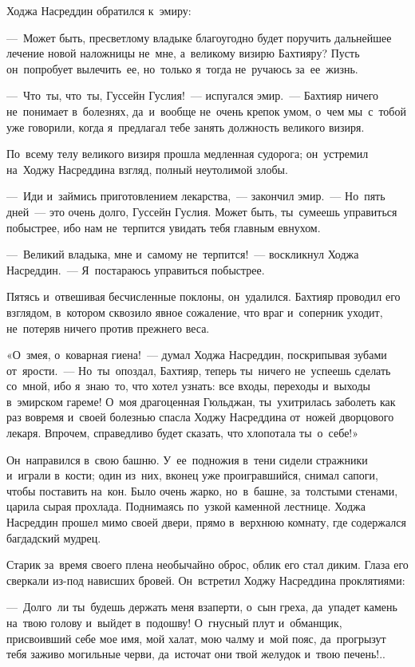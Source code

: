 \documentclass[12pt,a4paper]{book}
\begin{document}
Ходжа Насреддин обратился к~эмиру:

—~Может быть, пресветлому владыке благоугодно будет поручить дальнейшее лечение новой наложницы не~мне, а~великому визирю Бахтияру? Пусть он~попробует вылечить~ее, но~только я~тогда не~ручаюсь за~ее~жизнь.

—~Что~ты, что~ты, Гуссейн Гуслия!~— испугался эмир.~— Бахтияр ничего не~понимает в~болезнях, да~и~вообще не~очень крепок умом, о~чем мы~с~тобой уже говорили, когда я~предлагал тебе занять должность великого визиря.

По~всему телу великого визиря прошла медленная судорога; он~устремил на~Ходжу Насреддина взгляд, полный неутолимой злобы.

—~Иди и~займись приготовлением лекарства,~— закончил эмир.~— Но~пять дней~— это очень долго, Гуссейн Гуслия. Может быть, ты~сумеешь управиться побыстрее, ибо нам не~терпится увидать тебя главным евнухом.

—~Великий владыка, мне и~самому не~терпится!~— воскликнул Ходжа Насреддин.~— Я~постараюсь управиться побыстрее.

Пятясь и~отвешивая бесчисленные поклоны, он~удалился. Бахтияр проводил его взглядом, в~котором сквозило явное сожаление, что враг и~соперник уходит, не~потеряв ничего против прежнего веса.

«О~змея, о~коварная гиена!~— думал Ходжа Насреддин, поскрипывая зубами от~ярости.~— Но~ты~опоздал, Бахтияр, теперь ты~ничего не~успеешь сделать со~мной, ибо я~знаю~то, что хотел узнать: все входы, переходы и~выходы в~эмирском гареме! О~моя драгоценная Гюльджан, ты~ухитрилась заболеть как раз вовремя и~своей болезнью спасла Ходжу Насреддина от~ножей дворцового лекаря. Впрочем, справедливо будет сказать, что хлопотала ты~о~себе!»

Он~направился в~свою башню. У~ее~подножия в~тени сидели стражники и~играли в~кости; один из~них, вконец уже проигравшийся, снимал сапоги, чтобы поставить на~кон. Было очень жарко, но~в~башне, за~толстыми стенами, царила сырая прохлада. Поднимаясь по~узкой каменной лестнице. Ходжа Насреддин прошел мимо своей двери, прямо в~верхнюю комнату, где содержался багдадский мудрец.

Старик за~время своего плена необычайно оброс, облик его стал диким. Глаза его сверкали из-под нависших бровей. Он~встретил Ходжу Насреддина проклятиями:

—~Долго~ли ты~будешь держать меня взаперти, о~сын греха, да~упадет камень на~твою голову и~выйдет в~подошву! О~гнусный плут и~обманщик, присвоивший себе мое имя, мой халат, мою чалму и~мой пояс, да~прогрызут тебя заживо могильные черви, да~источат они твой желудок и~твою печень!..
\end{document}
